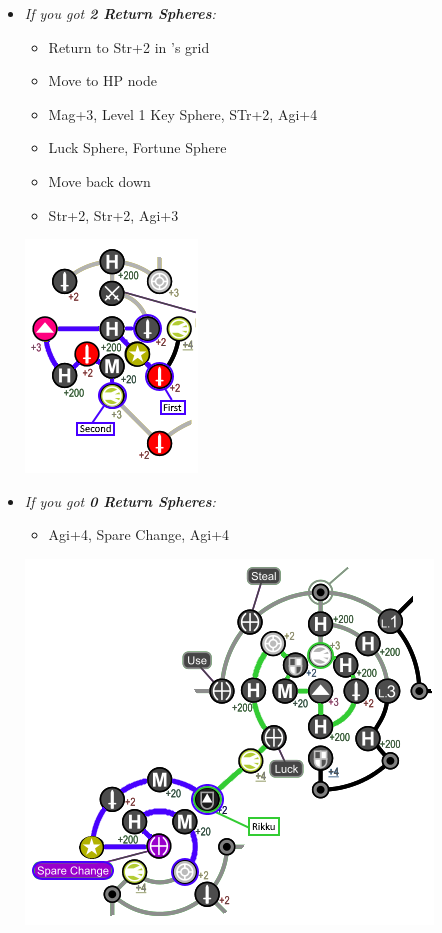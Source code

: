 \begin{spheregrid}
\begin{multicols}{2}
\begin{itemize}
\begin{itemize}
		\columnbreak
		\item \textit{If you got \textbf{2 Return Spheres}:}
		\begin{itemize}
			\item Return to Str+2 in \wakka's grid
			\item Move to HP node
			\item Mag+3, Level 1 Key Sphere, STr+2, Agi+4
			\item Luck Sphere, Fortune Sphere
			\item Move back down
			\item Str+2, Str+2, Agi+3
		\end{itemize}
		\includegraphics[width=.5\columnwidth]{graphics/2_and_2_with_luck}
		\item \textit{If you got \textbf{0 Return Spheres}:}
		\begin{itemize}
			\rikkuf Move to the MDef Node below Agi+4 below you
			\yunaf Friend Sphere to \rikku
			\item Agi+4, Spare Change, Agi+4 
		\end{itemize}
		\includegraphics[width=.7\columnwidth]{graphics/0_return_w_luck}
	\end{itemize}
\end{itemize}
\end{multicols}
\end{spheregrid}

